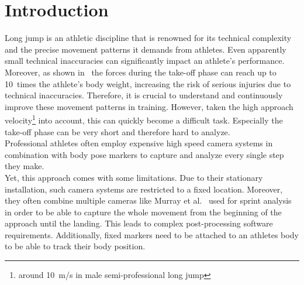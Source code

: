 \chapter{Introduction}
Long jump is an athletic discipline that is renowned for its technical
complexity and the precise movement patterns it demands from athletes.
Even apparently small technical inaccuracies can significantly impact an
athlete's performance.
Moreover, as shown in~\cite{long_jump_dynamics} the forces during the take-off 
phase can reach up to 10~times the athlete's body weight, 
increasing the risk of serious injuries due to technical inaccuracies.
Therefore, it is crucial to understand and continuously improve these movement 
patterns in training.
However, taken the high approach velocity\footnote{around 10~m/s in male 
semi-professional long jump} into account, this can quickly become a difficult 
task.
Especially the take-off phase can be very short and therefore hard to analyze.\\

\noindent Professional athletes often employ expensive high speed camera 
systems in combination with body pose markers to capture and analyze every 
single step they make.\\
Yet, this approach comes with some limitations.
Due to their stationary installation, such camera systems are restricted to a
fixed location.
Moreover, they often combine multiple cameras like Murray et al.~\cite{
elite_camera_setup} used for sprint analysis in order to be able to capture the
whole movement from the beginning of the approach until the landing.
This leads to complex post-processing software requirements.
Additionally, fixed markers need to be attached to an athletes body to be able 
to track their body position.\\


